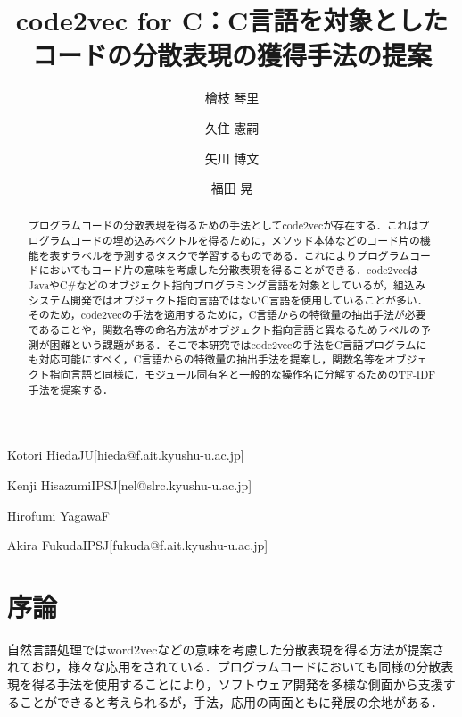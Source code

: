 \documentclass[submit,techrep,noauthor]{ipsj}
\begin{document}
\title{code2vec for C：C言語を対象としたコードの分散表現の獲得手法の提案}



\author{檜枝 琴里}{Kotori Hieda}{JU}[hieda@f.ait.kyushu-u.ac.jp]
\author{久住 憲嗣}{Kenji Hisazumi}{IPSJ}[nel@slrc.kyushu-u.ac.jp]
\author{矢川 博文}{Hirofumi Yagawa}{F}
\author{福田 晃}{Akira Fukuda}{IPSJ}[fukuda@f.ait.kyushu-u.ac.jp]

\begin{abstract}
プログラムコードの分散表現を得るための手法としてcode2vecが存在する．これはプログラムコードの埋め込みベクトルを得るために，メソッド本体などのコード片の機能を表すラベルを予測するタスクで学習するものである．これによりプログラムコードにおいてもコード片の意味を考慮した分散表現を得ることができる．code2vecはJavaやC\#などのオブジェクト指向プログラミング言語を対象としているが，組込みシステム開発ではオブジェクト指向言語ではないC言語を使用していることが多い．そのため，code2vecの手法を適用するために，C言語からの特徴量の抽出手法が必要であることや，関数名等の命名方法がオブジェクト指向言語と異なるためラベルの予測が困難という課題がある．そこで本研究ではcode2vecの手法をC言語プログラムにも対応可能にすべく，C言語からの特徴量の抽出手法を提案し，関数名等をオブジェクト指向言語と同様に，モジュール固有名と一般的な操作名に分解するためのTF-IDF手法を提案する．
\end{abstract}



\maketitle

\section{序論}
自然言語処理ではword2vec\cite{rong2014word2vec}などの意味を考慮した分散表現を得る方法が提案されており，様々な応用をされている．プログラムコードにおいても同様の分散表現を得る手法を使用することにより，ソフトウェア開発を多様な側面から支援することができると考えられるが，手法，応用の両面ともに発展の余地がある．
\end{document}
